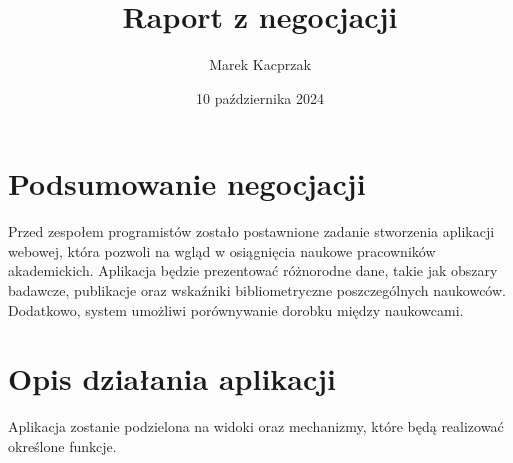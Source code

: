 \documentclass{article}
\title{Raport z negocjacji}
\author{Marek Kacprzak}
\date{10 października 2024}
\begin{document}
\maketitle
\newpage
\tableofcontents
\newpage

\section{Podsumowanie negocjacji}
Przed zespołem programistów zostało postawnione zadanie stworzenia aplikacji webowej, która pozwoli na wgląd w osiągnięcia naukowe pracowników akademickich. Aplikacja będzie prezentować różnorodne dane, takie jak obszary badawcze, publikacje oraz wskaźniki bibliometryczne poszczególnych naukowców.
Dodatkowo, system umożliwi porównywanie dorobku między naukowcami.

\section{Opis działania aplikacji}
Aplikacja zostanie podzielona na widoki oraz mechanizmy, które będą realizować określone funkcje.
\end{document}
